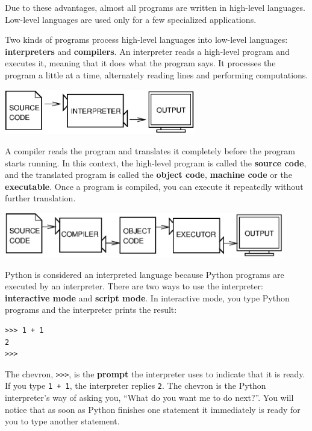\documentclass[10pt]{book}
\begin{document}
Due to these advantages, almost all programs are written in high-level
languages.  Low-level languages are used only for a few specialized
applications.


Two kinds of programs process high-level languages
into low-level languages: {\bf interpreters} and {\bf compilers}.
An interpreter reads a high-level program and executes it, meaning that it
does what the program says.  It processes the program a little at a time,
alternately reading lines and performing computations.

\beforefig
\centerline{\includegraphics[height=0.77in]{figs/interpret.eps}}
\afterfig


A compiler reads the program and translates it completely before the
program starts running.  In this context, the high-level program is
called the {\bf source code}, and the translated program is called the
{\bf object code}, {\bf machine code} or the {\bf executable}.  
Once a program is compiled, you can execute it 
repeatedly without further translation.

\beforefig
\centerline{\includegraphics[height=0.77in]{figs/compile.eps}}
\afterfig

Python is considered an interpreted language because Python programs
are executed by an interpreter.  There are two ways to use the
interpreter: {\bf interactive mode} and {\bf script mode}. In
interactive mode, you type Python programs and the interpreter prints
the result:


\beforeverb
\begin{verbatim}
>>> 1 + 1
2
>>>
\end{verbatim}
\afterverb
%
The chevron, {\tt >>>}, is the
{\bf prompt} the interpreter uses to indicate that it is ready.  If
you type {\tt 1 + 1}, the interpreter replies {\tt 2}.
The chevron is the Python interpreter's way of asking you, ``What
do you want me to do next?''.  You will notice that as soon as 
Python finishes one statement it immediately is ready for you to type 
another statement.
\end{document}
